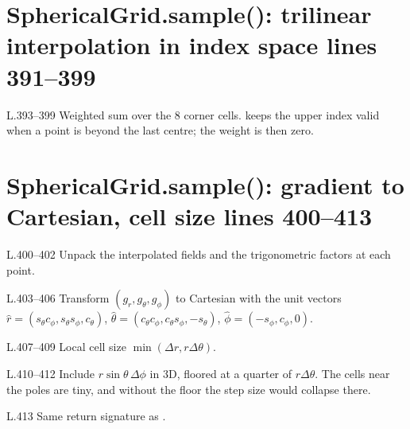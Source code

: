 \section*{\normalsize SphericalGrid.sample(): trilinear interpolation in index space \hfill{\small\mdseries\color{gray}lines 391--399}}

\begin{lines}
\item[L.393–399] Weighted sum over the 8 corner cells.  keeps the upper index valid when a point is beyond the last centre; the weight is then zero.
\end{lines}
\section*{\normalsize SphericalGrid.sample(): gradient to Cartesian, cell size \hfill{\small\mdseries\color{gray}lines 400--413}}

\begin{lines}
\item[L.400–402] Unpack the interpolated fields and the trigonometric factors at each point.
\item[L.403–406] Transform $(g_r,g_\theta,g_\phi)$ to Cartesian with the unit vectors $\hat r=(s_\theta c_\phi, s_\theta s_\phi, c_\theta)$, $\hat\theta=(c_\theta c_\phi, c_\theta s_\phi, -s_\theta)$, $\hat\phi=(-s_\phi, c_\phi, 0)$.
\item[L.407–409] Local cell size $\min(\Delta r, r\Delta\theta)$.
\item[L.410–412] Include $r\sin\theta\,\Delta\phi$ in 3D, floored at a quarter of $r\Delta\theta$. The cells near the poles are tiny, and without the floor the step size would collapse there.
\item[L.413] Same return signature as .
\end{lines}
